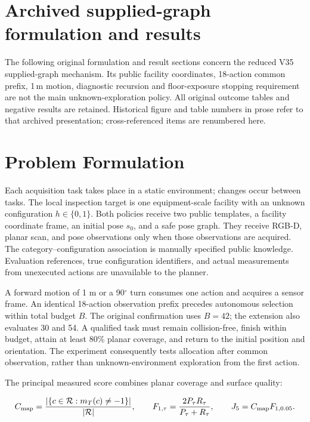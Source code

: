 \clearpage
\section*{Archived supplied-graph formulation and results}
The following original formulation and result sections concern the reduced V35 supplied-graph mechanism. Its public facility coordinates, 18-action common prefix, 1\,m motion, diagnostic recursion and floor-exposure stopping requirement are not the main unknown-exploration policy. All original outcome tables and negative results are retained. Historical figure and table numbers in prose refer to that archived presentation; cross-referenced items are renumbered here.
\hypertarget{problem-formulation}{%
\section{Problem Formulation}\label{problem-formulation}}

Each acquisition task takes place in a static environment; changes occur between tasks. The local inspection target is one equipment-scale facility with an unknown configuration \(h\in\{0,1\}\). Both policies receive two public templates, a facility coordinate frame, an initial pose \(s_0\), and a safe pose graph. They receive RGB-D, planar scan, and pose observations only when those observations are acquired. The category--configuration association is manually specified public knowledge. Evaluation references, true configuration identifiers, and actual measurements from unexecuted actions are unavailable to the planner.

A forward motion of 1 m or a 90\ensuremath{^{\circ}} turn consumes one action and acquires a sensor frame. An identical 18-action observation prefix precedes autonomous selection within total budget \(B\). The original confirmation uses \(B=42\); the extension also evaluates 30 and 54. A qualified task must remain collision-free, finish within budget, attain at least 80\% planar coverage, and return to the initial position and orientation. The experiment consequently tests allocation after common observation, rather than unknown-environment exploration from the first action.

The principal measured score combines planar coverage and surface quality:

\[
C_{\rm map}=\frac{|\{c\in\mathcal R:m_T(c)\ne-1\}|}{|\mathcal R|},
\qquad F_{1,\tau}=\frac{2P_\tau R_\tau}{P_\tau+R_\tau},
\qquad J_5=C_{\rm map}F_{1,0.05}.
\]

